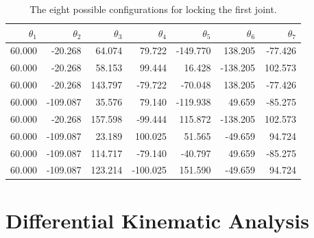 \documentclass{article}
\begin{document}
\begin{table}[h]
\centering
\begin{tabular}{*{7}{r}}
\toprule
$\theta_1$ & $\theta_2$ & $\theta_3$ & $\theta_4$ & $\theta_5$ & $\theta_6$ & $\theta_7$ \\
\midrule
60.000 &  -20.268   &  64.074 &   79.722 & -149.770 &  138.205 & -77.426 \\
60.000 &  -20.268   &  58.153 &   99.444 &   16.428 & -138.205 & 102.573 \\
60.000 &  -20.268   & 143.797 &  -79.722 &  -70.048 &  138.205 & -77.426 \\
60.000 & -109.087   &  35.576 &   79.140 & -119.938 &   49.659 & -85.275 \\
60.000 &  -20.268   & 157.598 &  -99.444 &  115.872 & -138.205 & 102.573 \\
60.000 & -109.087   &  23.189 &  100.025 &   51.565 &  -49.659 &  94.724 \\
60.000 & -109.087   & 114.717 &  -79.140 &  -40.797 &   49.659 & -85.275 \\
60.000 & -109.087   & 123.214 & -100.025 &  151.590 &  -49.659 &  94.724 \\
\bottomrule
\end{tabular}
\caption{The eight possible configurations for locking the first joint.}
\end{table}

\section{Differential Kinematic Analysis}
\end{document}
